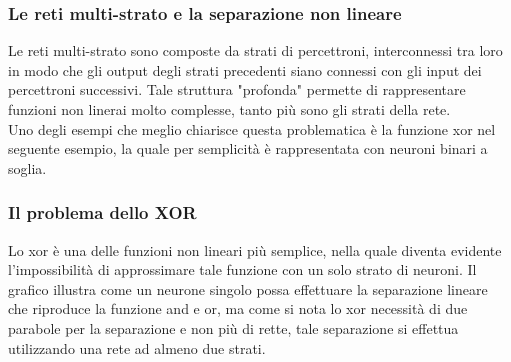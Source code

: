 \documentclass[10pt,a4paper]{article}
\begin{document}
\newpage
\subsubsection*{Le reti multi-strato e la separazione non lineare} 
Le reti multi-strato sono composte da strati di percettroni, interconnessi tra loro in modo che gli output degli strati precedenti siano connessi con gli input dei percettroni successivi. Tale struttura "profonda" permette di rappresentare funzioni non linerai molto complesse, tanto più sono gli strati della rete.\\
Uno degli esempi che meglio chiarisce questa problematica è la funzione xor nel seguente esempio, la quale per semplicità è rappresentata con neuroni binari a soglia.

\subsubsection*{Il problema dello XOR}
Lo xor è una delle funzioni non lineari più semplice, nella quale diventa evidente l'impossibilità di approssimare tale funzione con un solo strato di neuroni.
Il grafico illustra come un neurone singolo possa effettuare la separazione lineare che riproduce la funzione and e or, ma come si nota lo xor necessità di due parabole per la separazione e non più di rette, tale separazione si effettua utilizzando una rete ad almeno due strati. 
%
\end{document}
